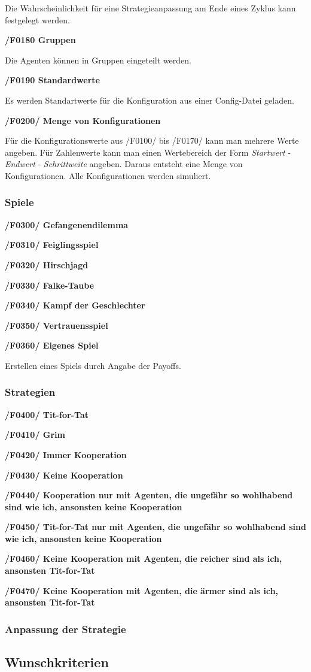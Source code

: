 Die Wahrscheinlichkeit für eine Strategieanpassung am Ende eines Zyklus kann festgelegt werden.

\textbf{/F0180 Gruppen}

Die Agenten können in Gruppen eingeteilt werden.

\textbf{/F0190 Standardwerte}

Es werden Standartwerte für die Konfiguration aus einer Config-Datei geladen.

\textbf{/F0200/ Menge von Konfigurationen}

Für die Konfigurationswerte aus /F0100/ bis /F0170/ kann man mehrere Werte angeben. Für Zahlenwerte kann man einen Wertebereich der Form \emph{Startwert} - \emph{Endwert} - \emph{Schrittweite} angeben. Daraus entsteht eine Menge von Konfigurationen. Alle Konfigurationen werden simuliert.

\subsubsection{Spiele}

\textbf{/F0300/ Gefangenendilemma}

\textbf{/F0310/ Feiglingsspiel}

\textbf{/F0320/ Hirschjagd}

\textbf{/F0330/ Falke-Taube}

\textbf{/F0340/ Kampf der Geschlechter}

\textbf{/F0350/ Vertrauensspiel}

\textbf{/F0360/ Eigenes Spiel}

Erstellen eines Spiels durch Angabe der Payoffs.

\subsubsection{Strategien}

\textbf{/F0400/ Tit-for-Tat}

\textbf{/F0410/ Grim}

\textbf{/F0420/ Immer Kooperation} 

\textbf{/F0430/ Keine Kooperation}

\textbf{/F0440/ Kooperation nur mit Agenten, die ungefähr so wohlhabend sind wie ich, ansonsten keine Kooperation}

\textbf{/F0450/ Tit-for-Tat nur mit Agenten, die ungefähr so wohlhabend sind wie ich, ansonsten keine Kooperation}

\textbf{/F0460/ Keine Kooperation mit Agenten, die reicher sind als ich, ansonsten Tit-for-Tat}

\textbf{/F0470/ Keine Kooperation mit Agenten, die ärmer sind als ich, ansonsten Tit-for-Tat}

\subsubsection{Anpassung der Strategie}


\subsection{Wunschkriterien}
